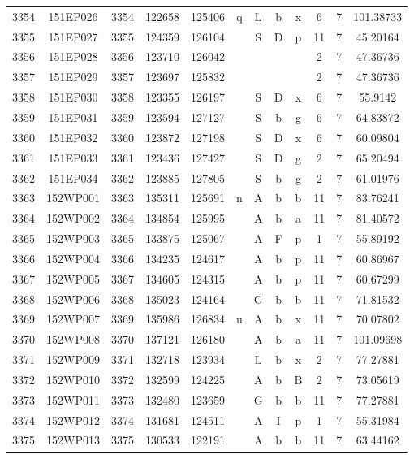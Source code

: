 \begin{tabular}{|*{12}{c|}}
3354 & 151EP026 & 3354 & 122658 & 125406 & q & L & b & x & 6 & 7 & 101.38733 \\ 
3355 & 151EP027 & 3355 & 124359 & 126104 &  & S & D & p & 11 & 7 & 45.20164 \\ 
3356 & 151EP028 & 3356 & 123710 & 126042 &  &  &  &  & 2 & 7 & 47.36736 \\ 
3357 & 151EP029 & 3357 & 123697 & 125832 &  &  &  &  & 2 & 7 & 47.36736 \\ 
3358 & 151EP030 & 3358 & 123355 & 126197 &  & S & D & x & 6 & 7 & 55.9142 \\ 
3359 & 151EP031 & 3359 & 123594 & 127127 &  & S & b & g & 6 & 7 & 64.83872 \\ 
3360 & 151EP032 & 3360 & 123872 & 127198 &  & S & D & x & 6 & 7 & 60.09804 \\ 
3361 & 151EP033 & 3361 & 123436 & 127427 &  & S & D & g & 2 & 7 & 65.20494 \\ 
3362 & 151EP034 & 3362 & 123885 & 127805 &  & S & b & g & 2 & 7 & 61.01976 \\ 
3363 & 152WP001 & 3363 & 135311 & 125691 & n & A & b & b & 11 & 7 & 83.76241 \\ 
3364 & 152WP002 & 3364 & 134854 & 125995 &  & A & b & a & 11 & 7 & 81.40572 \\ 
3365 & 152WP003 & 3365 & 133875 & 125067 &  & A & F & p & 1 & 7 & 55.89192 \\ 
3366 & 152WP004 & 3366 & 134235 & 124617 &  & A & b & p & 11 & 7 & 60.86967 \\ 
3367 & 152WP005 & 3367 & 134605 & 124315 &  & A & b & p & 11 & 7 & 60.67299 \\ 
3368 & 152WP006 & 3368 & 135023 & 124164 &  & G & b & b & 11 & 7 & 71.81532 \\ 
3369 & 152WP007 & 3369 & 135986 & 126834 & u & A & b & x & 11 & 7 & 70.07802 \\ 
3370 & 152WP008 & 3370 & 137121 & 126180 &  & A & b & a & 11 & 7 & 101.09698 \\ 
3371 & 152WP009 & 3371 & 132718 & 123934 &  & L & b & x & 2 & 7 & 77.27881 \\ 
3372 & 152WP010 & 3372 & 132599 & 124225 &  & A & b & B & 2 & 7 & 73.05619 \\ 
3373 & 152WP011 & 3373 & 132480 & 123659 &  & G & b & b & 11 & 7 & 77.27881 \\ 
3374 & 152WP012 & 3374 & 131681 & 124511 &  & A & I & p & 1 & 7 & 55.31984 \\ 
3375 & 152WP013 & 3375 & 130533 & 122191 &  & A & b & b & 11 & 7 & 63.44162 \\ 

\end{tabular}
